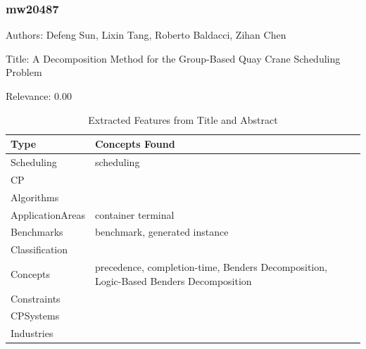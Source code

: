 \subsubsection{mw20487}
\label{mw:mw20487}

Authors: Defeng Sun, Lixin Tang, Roberto Baldacci, Zihan Chen

Title: A Decomposition Method for the Group-Based Quay Crane Scheduling Problem

Relevance:  0.00

{\scriptsize
\begin{longtable}{p{2cm}p{20cm}}
\caption{Extracted Features from Title and Abstract}\\ \toprule
Type & Concepts Found\\ \midrule
\endhead
\bottomrule
\endfoot
Scheduling & scheduling\\ 
CP & \\ 
Algorithms & \\ 
ApplicationAreas & container terminal\\ 
Benchmarks & benchmark, generated instance\\ 
Classification & \\ 
Concepts & precedence, completion-time, Benders Decomposition, Logic-Based Benders Decomposition\\ 
Constraints & \\ 
CPSystems & \\ 
Industries & \\ 
\end{longtable}
}

